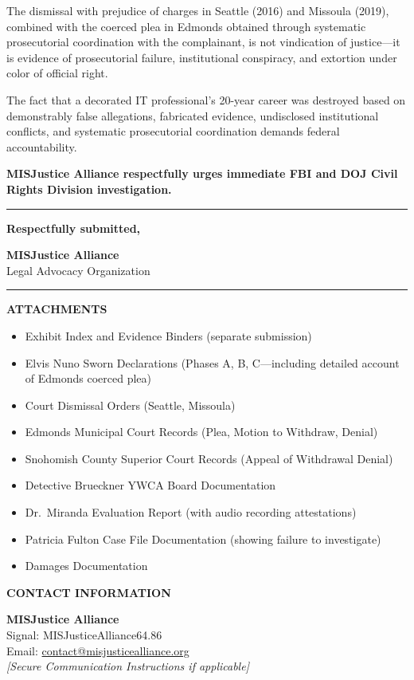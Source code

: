 \documentclass[11pt, letterpaper]{article}
\newcommand{\sectiontitle}[1]{\vspace{0.2in}\noindent\textcolor{NavyBlue}{\large\textbf{#1}}\vspace{0.1in}}
\begin{document}
The dismissal with prejudice of charges in Seattle (2016) and Missoula (2019), combined with the coerced plea in Edmonds obtained through systematic prosecutorial coordination with the complainant, is not vindication of justice---it is evidence of prosecutorial failure, institutional conspiracy, and extortion under color of official right.

The fact that a decorated IT professional's 20-year career was destroyed based on demonstrably false allegations, fabricated evidence, undisclosed institutional conflicts, and systematic prosecutorial coordination demands federal accountability.

\textbf{MISJustice Alliance respectfully urges immediate FBI and DOJ Civil Rights Division investigation.}

\vspace{0.3in}
\noindent\rule{\textwidth}{0.4pt}
\vspace{0.15in}

\noindent
\textbf{Respectfully submitted,}

\vspace{0.15in}
\noindent
\textbf{MISJustice Alliance}\\
Legal Advocacy Organization

\vspace{0.3in}
\noindent\rule{\textwidth}{0.4pt}

\sectiontitle{ATTACHMENTS}

\begin{itemize}[leftmargin=*,itemsep=2pt]
    \item Exhibit Index and Evidence Binders (separate submission)
    \item Elvis Nuno Sworn Declarations (Phases A, B, C---including detailed account of Edmonds coerced plea)
    \item Court Dismissal Orders (Seattle, Missoula)
    \item Edmonds Municipal Court Records (Plea, Motion to Withdraw, Denial)
    \item Snohomish County Superior Court Records (Appeal of Withdrawal Denial)
    \item Detective Brueckner YWCA Board Documentation
    \item Dr.\ Miranda Evaluation Report (with audio recording attestations)
    \item Patricia Fulton Case File Documentation (showing failure to investigate)
    \item Damages Documentation
\end{itemize}

\sectiontitle{CONTACT INFORMATION}

\noindent
\textbf{MISJustice Alliance}\\
Signal: MISJusticeAlliance64.86\\
Email: \href{mailto:contact@misjusticealliance.org}{contact@misjusticealliance.org}\\
\textit{[Secure Communication Instructions if applicable]}
\end{document}
